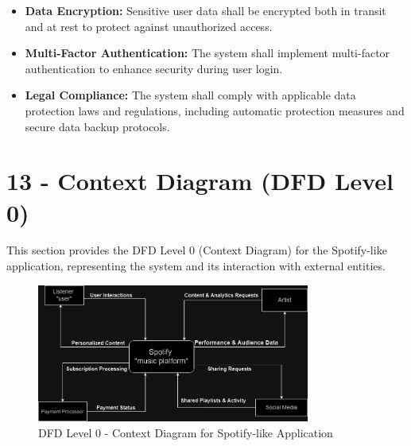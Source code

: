 \documentclass[a4paper,10pt]{article}
\begin{document}
\begin{itemize}[leftmargin=*]
    \item \textbf{Data Encryption:} Sensitive user data shall be encrypted both in transit and at rest to protect against unauthorized access.
    \item \textbf{Multi-Factor Authentication:} The system shall implement multi-factor authentication to enhance security during user login.
    \item \textbf{Legal Compliance:} The system shall comply with applicable data protection laws and regulations, including automatic protection measures and secure data backup protocols.
\end{itemize}
\newpage
\section*{13 - Context Diagram (DFD Level 0)}
This section provides the DFD Level 0 (Context Diagram) for the Spotify-like application, representing the system and its interaction with external entities.

\begin{figure}[h!]
    \centering
    \includegraphics[width=0.8\textwidth]{DFD@Dark.drawio.png}
    \caption{DFD Level 0 - Context Diagram for Spotify-like Application}
    \label{fig:dfd-level0}
\end{figure}
\end{document}
